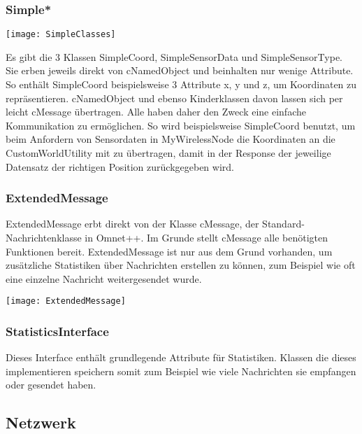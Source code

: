 \subsubsection{Simple*}

\begin{center}
\texttt{[image: SimpleClasses]}
\end{center}

Es gibt die 3 Klassen SimpleCoord, SimpleSensorData und SimpleSensorType.  Sie erben jeweils direkt von cNamedObject und beinhalten nur wenige Attribute. So enthält SimpleCoord beispielsweise 3 Attribute x, y und z, um Koordinaten zu repräsentieren.\newline
cNamedObject und ebenso Kinderklassen davon lassen sich per leicht cMessage übertragen. Alle haben daher den Zweck eine einfache Kommunikation zu ermöglichen. So wird beispielsweise SimpleCoord benutzt, um beim Anfordern von Sensordaten in MyWirelessNode die Koordinaten an die CustomWorldUtility mit zu übertragen, damit in der Response der jeweilige Datensatz der richtigen Position zurückgegeben wird.

\subsubsection{ExtendedMessage}

ExtendedMessage erbt direkt von der Klasse cMessage, der Standard-Nachrichtenklasse in Omnet++. Im Grunde stellt cMessage alle benötigten Funktionen bereit. ExtendedMessage ist nur aus dem Grund vorhanden, um zusätzliche Statistiken über Nachrichten erstellen zu können, zum Beispiel wie oft eine einzelne Nachricht weitergesendet wurde.

\begin{center}
\texttt{[image: ExtendedMessage]}
\end{center}

\subsubsection{StatisticsInterface}

Dieses Interface enthält grundlegende Attribute für Statistiken. Klassen die dieses implementieren speichern somit zum Beispiel wie viele Nachrichten sie empfangen oder gesendet haben.

\subsection{Netzwerk}

